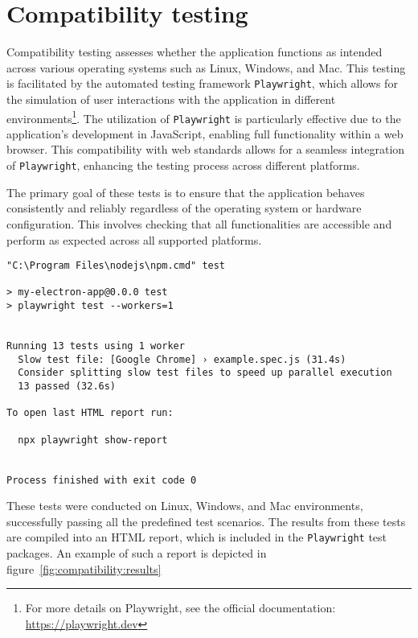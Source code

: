 \section{Compatibility testing}

Compatibility testing assesses whether the application functions as intended across various operating systems such as Linux, Windows, and Mac. This testing is facilitated by the automated testing framework \texttt{Playwright}, which allows for the simulation of user interactions with the application in different environments\footnote{For more details on Playwright, see the official documentation: \url{https://playwright.dev}}. The utilization of \texttt{Playwright} is particularly effective due to the application's development in JavaScript, enabling full functionality within a web browser. This compatibility with web standards allows for a seamless integration of \texttt{Playwright}, enhancing the testing process across different platforms.

The primary goal of these tests is to ensure that the application behaves consistently and reliably regardless of the operating system or hardware configuration. This involves checking that all functionalities are accessible and perform as expected across all supported platforms.

\begin{clisting}
\label{list:autotests}
\begin{verbatim}
"C:\Program Files\nodejs\npm.cmd" test

> my-electron-app@0.0.0 test
> playwright test --workers=1


Running 13 tests using 1 worker
  Slow test file: [Google Chrome] › example.spec.js (31.4s)
  Consider splitting slow test files to speed up parallel execution
  13 passed (32.6s)

To open last HTML report run:

  npx playwright show-report


Process finished with exit code 0
\end{verbatim}
\end{clisting}

These tests were conducted on Linux, Windows, and Mac environments, successfully passing all the predefined test scenarios. The results from these tests are compiled into an HTML report, which is included in the \texttt{Playwright} test packages. An example of such a report is depicted in figure~\ref{fig:compatibility:results}

